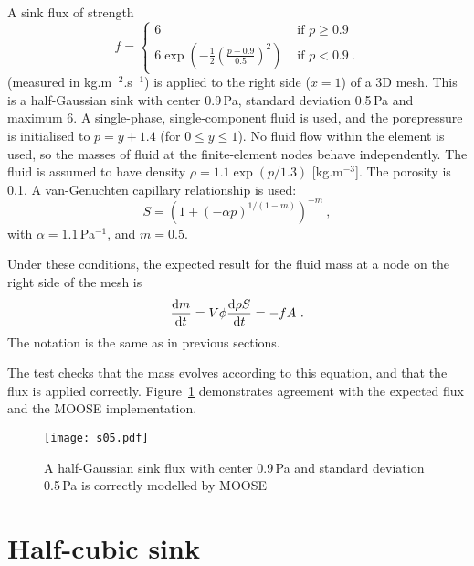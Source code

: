 A sink flux of strength
\begin{equation}
f = \left\{
\begin{array}{ll}
6 & \mbox{ if } p \geq 0.9 \\
6\exp\left(-\frac{1}{2} \left(\frac{p-0.9}{0.5} \right)^{2}\right) & \mbox { if } p < 0.9 \ .
\end{array}
\right.
\end{equation}
(measured in kg.m$^{-2}$.s$^{-1}$) is applied to the right side
($x=1$) of a 3D mesh.  This is a half-Gaussian sink with center
0.9\,Pa, standard deviation 0.5\,Pa and maximum 6.  A single-phase,
single-component fluid is used, and the porepressure is initialised to
$p=y+1.4$ (for $0\leq y \leq 1$).  No fluid flow within the element is
used, so the masses of fluid at the finite-element nodes behave
independently.  The fluid is assumed to have density $\rho = 1.1
\exp(p/1.3)$ [kg.m$^{-3}$].  The porosity is 0.1.  A van-Genuchten capillary
relationship is used:
\begin{equation}
S = \left( 1 + (-\alpha p)^{1/(1-m)} \right)^{-m} \ ,
\end{equation}
with $\alpha = 1.1$\,Pa$^{-1}$, and $m=0.5$.

Under these conditions, the expected result for the fluid mass at a
node on the right side of the mesh is
\begin{equation}
\frac{\mathrm{d} m}{\mathrm{d} t} = V\phi \frac{\mathrm{d} \rho S}{\mathrm{d} t} = -f A \ .
\end{equation}
The notation is the same as in previous sections.

The test checks that the mass evolves according to this equation, and
that the flux is applied correctly.  Figure~\ref{s05.fig} demonstrates
agreement with the expected flux and the MOOSE implementation.

\begin{figure}[htb]
\begin{center}
\texttt{[image: s05.pdf]}
\caption{A half-Gaussian sink flux with center 0.9\,Pa and standard
  deviation 0.5\,Pa is correctly modelled by MOOSE}
\label{s05.fig}
\end{center}
\end{figure}



\section{Half-cubic sink}
\label{half_cubic.sec}

